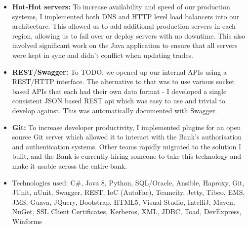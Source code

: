 \documentclass[11pt,a4paper, roman]{moderncv} %
\begin{document}
{\begin{itemize}
\item \textbf{Hot-Hot servers:} To increase availability and speed of our production systems, I implemented both DNS and HTTP level load balancers into our architecture. This allowed us to add additional production servers in each region, allowing us to fail over or deploy servers with no downtime. This also involved significant work on the Java application to ensure that all servers were kept in sync and didn't conflict when updating trades.
\item \textbf{REST/Swagger:} To TODO, we opened up our internal APIs using a REST/HTTP interface. The alternative to that was to use various socket based APIs that each had their own data format - I developed a single consistent JSON based REST api which was easy to use and trivial to develop against. This was automatically documented with Swagger.
\item \textbf{Git:} To increase developer productivity, I implemented plugins for an open source Git server which allowed it to interact with the Bank's authorisation and authentication systems. Other teams rapidly migrated to the solution I built, and the Bank is currently hiring someone to take this technology and make it usable across the entire bank.
\item {Technologies used:} C\#, Java 8, Python, SQL/Oracle, Ansible, Haproxy, Git, JUnit, nUnit, Swagger, REST, IoC (AutoFac), Teamcity, Jetty, Tibco, EMS, JMS, Guava, JQuery, Bootstrap, HTML5, Visual Studio, IntelliJ, Maven, NuGet, SSL Client Certificates, Kerberos, XML, JDBC, Toad, DevExpress, Winforms
\end{itemize}
}


\end{document}

